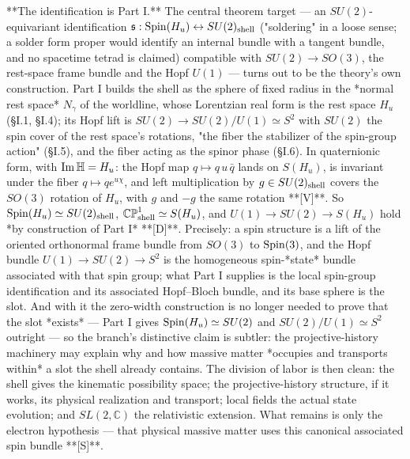**The identification is Part I.** The central theorem target — an $SU(2)$-equivariant identification $\mathfrak s:{\rm Spin}(H_u)\leftrightarrow SU(2)_{\rm shell}$ ("soldering" in a loose sense; a solder form proper would identify an internal bundle with a tangent bundle, and no spacetime tetrad is claimed) compatible with $SU(2)\to SO(3)$, the rest-space frame bundle and the Hopf $U(1)$ — turns out to be the theory's own construction. Part I builds the shell as the sphere of fixed radius in the *normal rest space* $N_\gamma$ of the worldline, whose Lorentzian real form is the rest space $H_u$ (§I.1, §I.4); its Hopf lift is $SU(2)\to SU(2)/U(1)\simeq S^2$ with $SU(2)$ the spin cover of the rest space's rotations, "the fiber the stabilizer of the spin-group action" (§I.5), and the fiber acting as the spinor phase (§I.6). In quaternionic form, with ${\rm Im}\,\mathbb H = H_u$: the Hopf map $q\mapsto q\,u\,\bar q$ lands on $S(H_u)$, is invariant under the fiber $q\mapsto qe^{u\chi}$, and left multiplication by $g\in SU(2)_{\rm shell}$ covers the $SO(3)$ rotation of $H_u$, with $g$ and $-g$ the same rotation **[V]**. So ${\rm Spin}(H_u)\simeq SU(2)_{\rm shell}$, $\mathbb{CP}^1_{\rm shell}\simeq S(H_u)$, and $U(1)\to SU(2)\to S(H_u)$ hold *by construction of Part I* **[D]**. Precisely: a spin structure is a lift of the oriented orthonormal frame bundle from $SO(3)$ to ${\rm Spin}(3)$, and the Hopf bundle $U(1)\to SU(2)\to S^2$ is the homogeneous spin-*state* bundle associated with that spin group; what Part I supplies is the local spin-group identification and its associated Hopf–Bloch bundle, and its base sphere is the slot. And with it the zero-width construction is no longer needed to prove that the slot *exists* — Part I gives ${\rm Spin}(H_u)\simeq SU(2)$ and $SU(2)/U(1)\simeq S^2$ outright — so the branch's distinctive claim is subtler: the projective-history machinery may explain why and how massive matter *occupies and transports within* a slot the shell already contains. The division of labor is then clean: the shell gives the kinematic possibility space; the projective-history structure, if it works, its physical realization and transport; local fields the actual state evolution; and $SL(2,\mathbb C)$ the relativistic extension. What remains is only the electron hypothesis — that physical massive matter uses this canonical associated spin bundle **[S]**.

